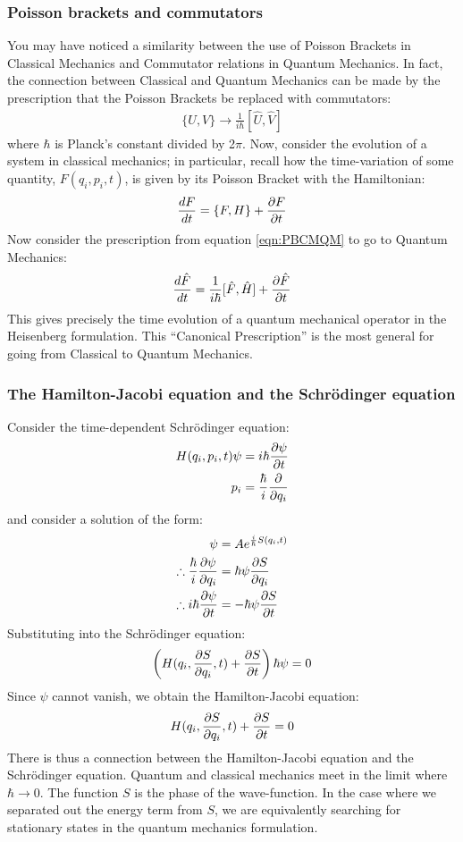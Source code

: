 \subsubsection{Poisson brackets and commutators}
You may have noticed a similarity between the use of Poisson Brackets in Classical Mechanics and Commutator relations in Quantum Mechanics. In fact, the connection between Classical and Quantum Mechanics can be made by the prescription that the Poisson Brackets be replaced with commutators:
\begin{align}
\{U,V\}\to \frac{1}{i\hbar}[\hat U,\hat V]
\label{eqn:PBCMQM}
\end{align}
where $\hbar$ is Planck's constant divided by 2$\pi$.
Now, consider the evolution of a system in classical mechanics; in particular, recall how the time-variation of some quantity, $F(q_i,p_i,t)$, is given by its Poisson Bracket with the Hamiltonian:
\begin{align}
\frac{dF}{dt}=\{F,H\}+\frac{\partial F}{\partial t}
\end{align}
Now consider the prescription from equation \ref{eqn:PBCMQM} to go to Quantum Mechanics:
\begin{align}
\frac{d\hat F}{dt}=\frac{1}{i\hbar}[\hat F,\hat H]+\frac{\partial \hat F}{\partial t}
\end{align}
This gives precisely the time evolution of a quantum mechanical operator in the Heisenberg formulation. This ``Canonical Prescription'' is the most general for going from Classical to Quantum Mechanics.

\subsubsection{The Hamilton-Jacobi equation and the Schr\"odinger equation}
Consider the time-dependent Schr\"odinger equation:
\begin{align}
H(q_i,p_i,t)\psi&=i\hbar\frac{\partial \psi}{\partial t}\nonumber\\
p_i&=\frac{\hbar}{i}\frac{\partial }{\partial q_i}
\end{align}
and consider a solution of the form:
\begin{align}
\psi&=A e^{\frac{i}{\hbar}S(q_i,t)}\nonumber\\
\therefore\frac{\hbar}{i} \frac{\partial \psi}{\partial q_i}&=\hbar\psi\frac{\partial S}{\partial q_i}\nonumber\\
\therefore i\hbar \frac{\partial \psi}{\partial t}&=-\hbar\psi\frac{\partial S}{\partial t}
\end{align}
Substituting into the Schr\"odinger equation:
\begin{align}
\left(H(q_i,\frac{\partial S}{\partial q_i},t)+\frac{\partial S}{\partial t}\right)\hbar\psi=0
\end{align}
Since $\psi$ cannot vanish, we obtain the Hamilton-Jacobi equation:
\begin{align}
H(q_i,\frac{\partial S}{\partial q_i},t)+\frac{\partial S}{\partial t}=0
\end{align}
There is thus a connection between the Hamilton-Jacobi equation and the Schr\"odinger equation. Quantum and classical mechanics meet in the limit where $\hbar\to 0$. The function $S$ is the phase of the wave-function. In the case where we separated out the energy term from $S$, we are equivalently searching for stationary states in the quantum mechanics formulation.

